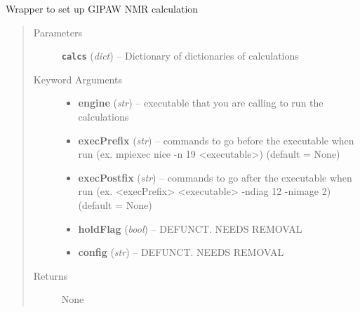 \documentclass[letterpaper,10pt,english]{sphinxmanual}
\begin{document}
\begin{fulllineitems}
\label{run:run.nmr}
Wrapper to set up GIPAW NMR calculation
\begin{quote}\begin{description}
\item[{Parameters}] \leavevmode
\textbf{\texttt{calcs}} (\emph{dict}) -- Dictionary of dictionaries of calculations

\item[{Keyword Arguments}] \leavevmode\begin{itemize}
\item {} 
\textbf{engine} (\emph{str}) --
executable that you are calling to run the calculations

\item {} 
\textbf{execPrefix} (\emph{str}) --
commands to go before the executable when run
(ex. mpiexec nice -n 19 \textless{}executable\textgreater{}) (default = None)

\item {} 
\textbf{execPostfix} (\emph{str}) --
commands to go after the executable when run
(ex. \textless{}execPrefix\textgreater{} \textless{}executable\textgreater{} -ndiag 12 -nimage 2) (default = None)

\item {} 
\textbf{holdFlag} (\emph{bool}) --
DEFUNCT. NEEDS REMOVAL

\item {} 
\textbf{config} (\emph{str}) --
DEFUNCT. NEEDS REMOVAL

\end{itemize}

\item[{Returns}] \leavevmode
None

\end{description}\end{quote}

\end{fulllineitems}

\end{document}
